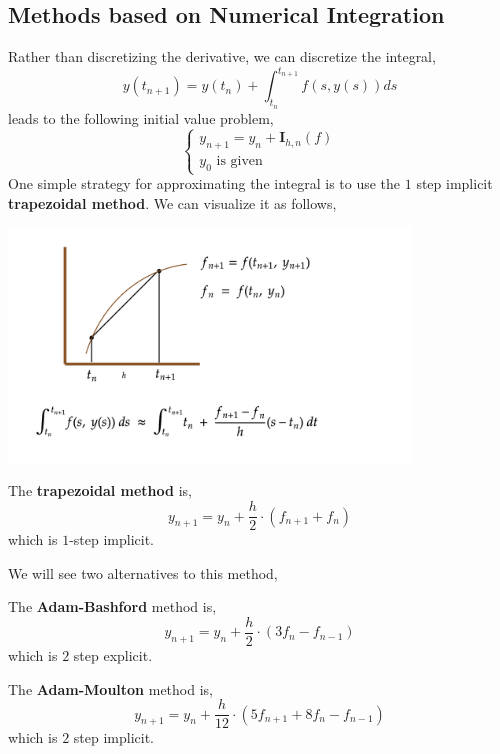 \subsection{Methods based on Numerical Integration}
Rather than discretizing the derivative, we can discretize the integral,
\[y(t_{n+1}) = y(t_n) + \int_{t_n}^{t_{n+1}} f(s, y(s)) ds\]
leads to the following initial value problem,
\[
\begin{cases}
	y_{n+1} = y_n + \mathbf{I}_{h, n}(f) \\
	y_0 \text{ is given}
\end{cases}
\]
One simple strategy for approximating the integral is to use the $1$ step implicit \textbf{trapezoidal method}. We can visualize it as follows,
\begin{center}
       \includegraphics[width=0.8\textwidth]{figures/fig-24.png}
\end{center}

\begin{defn}
	The \textbf{trapezoidal method} is,
	\[y_{n+1} = y_n + \frac{h}{2} \cdot (f_{n+1} + f_n)\]
	which is $1$-step implicit.
\end{defn}

\noindent We will see two alternatives to this method,

\begin{defn}
	The \textbf{Adam-Bashford} method is,
	\[y_{n+1} = y_n + \frac{h}{2} \cdot (3f_n - f_{n-1})\]
	which is $2$ step explicit.
\end{defn}

\begin{defn}
	The \textbf{Adam-Moulton} method is,
	\[y_{n+1} = y_n + \frac{h}{12} \cdot (5 f_{n+1} + 8 f_n - f_{n-1})\]
	which is $2$ step implicit.
\end{defn}

